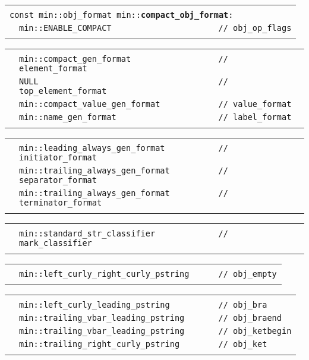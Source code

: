 \documentclass[12pt]{article}
\makeatletter
\newcommand{\TT}[1]{{\tt \bfseries #1}}
\newcommand{\ttindex}[1]{\index{#1@{\tt #1}}}
\newenvironment{indpar}[1][0.3in]%
	{\begin{list}{}%
		     {\setlength{\itemsep}{0in}%
		      \setlength{\topsep}{0in}%
		      \setlength{\parsep}{1ex}%
		      \setlength{\labelwidth}{#1}%
		      \setlength{\leftmargin}{#1}%
		      \addtolength{\leftmargin}{\labelsep}}%
	 \item}%
	{\end{list}}
\newcommand{\LABEL}[1]{\label{#1}}
\newlength{\ARGBREAKLENGTH}
\newcommand{\ARGBREAK}[1][\ARGBREAKLENGTH]{\\&\hspace*{#1}}
\newcommand{\MINKEY}[1]%
	   {\TT{#1}\ttindex{min::#1}\ttindex{#1}}
\makeatother
\begin{document}
\begin{indpar}[1em]

\begin{tabular}{r@{}l}\hspace*{0.1in} \\[-3ex]
\multicolumn{2}{l}{\tt const min::obj\_format
                   min::\MINKEY{compact\_obj\_format}:}%
\LABEL{MIN::COMPACT_OBJ_FORMAT}\ARGBREAK
\verb|min::ENABLE_COMPACT                      // obj_op_flags|\ARGBREAK
\end{tabular}

\vspace{-4ex}\begin{tabular}{r@{}l}\hspace*{0.1in}\ARGBREAK
\verb|min::compact_gen_format                  // element_format|\ARGBREAK
\verb|NULL                                     // top_element_format|\ARGBREAK
\verb|min::compact_value_gen_format            // value_format|\ARGBREAK
\verb|min::name_gen_format                     // label_format|\ARGBREAK
\end{tabular}

\vspace{-4ex}\begin{tabular}{r@{}l}\hspace*{0.1in}\ARGBREAK
\verb|min::leading_always_gen_format           // initiator_format|\ARGBREAK
\verb|min::trailing_always_gen_format          // separator_format|\ARGBREAK
\verb|min::trailing_always_gen_format          // terminator_format|\ARGBREAK
\end{tabular}

\vspace{-4ex}\begin{tabular}{r@{}l}\hspace*{0.1in}\ARGBREAK
\verb|min::standard_str_classifier             // mark_classifier|\ARGBREAK
\end{tabular}

\vspace{-4ex}\begin{tabular}{r@{}l}\hspace*{0.1in}\ARGBREAK
\verb|min::left_curly_right_curly_pstring      // obj_empty|\ARGBREAK
\end{tabular}

\vspace{-4ex}\begin{tabular}{r@{}l}\hspace*{0.1in}\ARGBREAK
\verb|min::left_curly_leading_pstring          // obj_bra|\ARGBREAK
\verb|min::trailing_vbar_leading_pstring       // obj_braend|\ARGBREAK
\verb|min::trailing_vbar_leading_pstring       // obj_ketbegin|\ARGBREAK
\verb|min::trailing_right_curly_pstring        // obj_ket|\ARGBREAK
\end{tabular}


\end{indpar}
\end{document}
